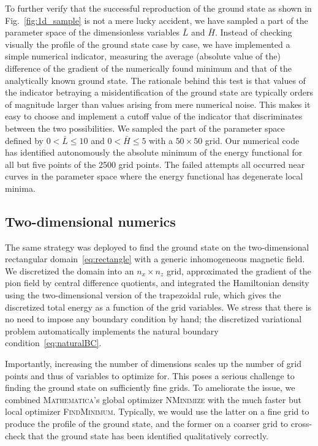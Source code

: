 \documentclass[pdflatex,iicol,sn-mathphys-num]{sn-jnl}
\begin{document}
To further verify that the successful reproduction of the ground state as shown in Fig.~\ref{fig:1d_sample} is not a mere lucky accident, we have sampled a part of the parameter space of the dimensionless variables $\bar L$ and $\bar H$. Instead of checking visually the profile of the ground state case by case, we have implemented a simple numerical indicator, measuring the average (absolute value of the) difference of the gradient of the numerically found minimum and that of the analytically known ground state. The rationale behind this test is that values of the indicator betraying a misidentification of the ground state are typically orders of magnitude larger than values arising from mere numerical noise. This makes it easy to choose and implement a cutoff value of the indicator that discriminates between the two possibilities. We sampled the part of the parameter space defined by $0<\bar L\leq10$ and $0<\bar H\leq5$ with a $50\times50$ grid. Our numerical code has identified autonomously the absolute minimum of the energy functional for all but five points of the 2500 grid points. The failed attempts all occurred near curves in the parameter space where the energy functional has degenerate local minima.


\subsection{Two-dimensional numerics}
\label{subsec:nonuniformBnonzeroMsample}

The same strategy was deployed to find the ground state on the two-dimensional rectangular domain~\eqref{eq:rectangle} with a generic inhomogeneous magnetic field. We discretized the domain into an $n_x\times n_z$ grid, approximated the gradient of the pion field by central difference quotients, and integrated the Hamiltonian density using the two-dimensional version of the trapezoidal rule, which gives the discretized total energy as a function of the grid variables. We stress that there is no need to impose any boundary condition by hand; the discretized variational problem automatically implements the natural boundary condition~\eqref{eq:naturalBC}.

Importantly, increasing the number of dimensions scales up the number of grid points and thus of variables to optimize for. This poses a serious challenge to finding the ground state on sufficiently fine grids. To ameliorate the issue, we combined \textsc{Mathematica}'s global optimizer \textsc{NMinimize} with the much faster but local optimizer \textsc{FindMinimum}. Typically, we would use the latter on a fine grid to produce the profile of the ground state, and the former on a coarser grid to cross-check that the ground state has been identified qualitatively correctly.
\end{document}
